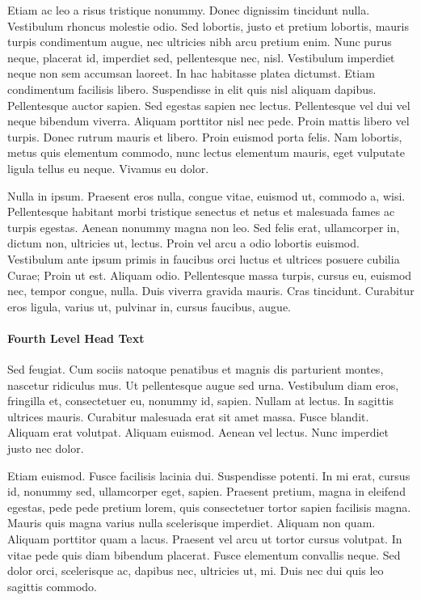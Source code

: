 \documentclass{wber}
\begin{document}
Etiam ac leo a risus tristique nonummy. Donec dignissim tincidunt nulla. Vestibulum rhoncus molestie odio. Sed
lobortis, justo et pretium lobortis, mauris turpis condimentum augue, nec ultricies nibh arcu pretium enim. Nunc
purus neque, placerat id, imperdiet sed, pellentesque nec, nisl. Vestibulum imperdiet neque non sem accumsan laoreet.
In hac habitasse platea dictumst. Etiam condimentum facilisis libero. Suspendisse in elit quis nisl aliquam dapibus.
Pellentesque auctor sapien. Sed egestas sapien nec lectus. Pellentesque vel dui vel neque bibendum viverra. Aliquam
porttitor nisl nec pede. Proin mattis libero vel turpis. Donec rutrum mauris et libero. Proin euismod porta felis.
Nam lobortis, metus quis elementum commodo, nunc lectus elementum mauris, eget vulputate ligula tellus eu neque.
Vivamus eu dolor.

Nulla in ipsum. Praesent eros nulla, congue vitae, euismod ut, commodo a, wisi. Pellentesque habitant morbi
tristique senectus et netus et malesuada fames ac turpis egestas. Aenean nonummy magna non leo. Sed felis erat,
ullamcorper in, dictum non, ultricies ut, lectus. Proin vel arcu a odio lobortis euismod. Vestibulum ante ipsum primis
in faucibus orci luctus et ultrices posuere cubilia Curae; Proin ut est. Aliquam odio. Pellentesque massa turpis, cursus
eu, euismod nec, tempor congue, nulla. Duis viverra gravida mauris. Cras tincidunt. Curabitur eros ligula, varius ut,
pulvinar in, cursus faucibus, augue.


\paragraph{Fourth Level Head Text}

Sed feugiat. Cum sociis natoque penatibus et magnis dis parturient montes, nascetur ridiculus mus. Ut pellentesque
augue sed urna. Vestibulum diam eros, fringilla et, consectetuer eu, nonummy id, sapien. Nullam at lectus. In sagittis
ultrices mauris. Curabitur malesuada erat sit amet massa. Fusce blandit. Aliquam erat volutpat. Aliquam euismod.
Aenean vel lectus. Nunc imperdiet justo nec dolor.

Etiam euismod. Fusce facilisis lacinia dui. Suspendisse potenti. In mi erat, cursus id, nonummy sed, ullamcorper
eget, sapien. Praesent pretium, magna in eleifend egestas, pede pede pretium lorem, quis consectetuer tortor sapien
facilisis magna. Mauris quis magna varius nulla scelerisque imperdiet. Aliquam non quam. Aliquam porttitor quam
a lacus. Praesent vel arcu ut tortor cursus volutpat. In vitae pede quis diam bibendum placerat. Fusce elementum
convallis neque. Sed dolor orci, scelerisque ac, dapibus nec, ultricies ut, mi. Duis nec dui quis leo sagittis commodo.
\end{document}
